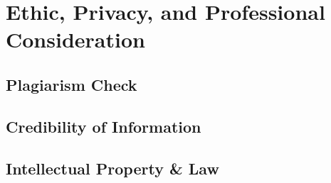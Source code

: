 \section{Ethic, Privacy, and Professional Consideration}
\label{sec:ethic-privacy-and-professional-consideration}

\subsection{Plagiarism Check}
\label{subsec:plagiarism-check}

\subsection{Credibility of Information}
\label{subsec:credibility-of-information}

\subsection{Intellectual Property \& Law}
\label{subsec:intellectual-property-and-law}